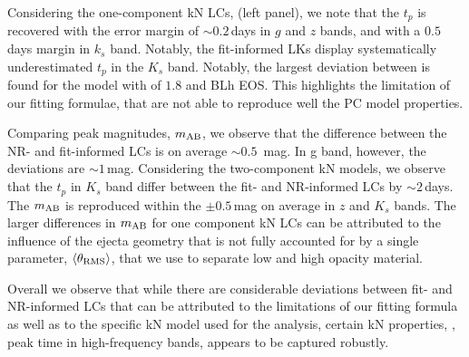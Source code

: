 Considering the one-component \ac{kN} \acp{LC}, (left panel), we note that the $t_p$ is 
recovered with the error margin of ${\sim}0.2\,$days in $g$ and $z$ bands, and with a 
$0.5\,$days margin in $k_s$ band. Notably, the fit-informed \acp{LK} display 
systematically underestimated $t_p$ in the $K_s$ band. 
%
Notably, the largest deviation between is found for the 
model with \mr{} of $1.8$ and BLh \ac{EOS}. This highlights the limitation of our 
fitting formulae, that are not able to reproduce well the \ac{PC} model properties.

Comparing peak magnitudes, $m_{\rm AB}$, we observe that the difference 
between the \ac{NR}- and fit-informed \acp{LC} is on average ${\sim}0.5$~mag. 
In g band, however, the deviations are ${\sim}1\,$mag.
Considering the two-component \ac{kN} models, we observe that the 
$t_p$ in $K_s$ band differ between the fit- and \ac{NR}-informed \acp{LC} by 
${\sim}2\,$days. The $m_{\rm AB}$ is reproduced within the ${\pm}0.5\,$mag 
on average in $z$ and $K_s$ bands.
%
The larger differences in $m_{\rm AB}$ for one component \ac{kN} \acp{LC} 
can be attributed to the influence of the ejecta geometry that is not 
fully accounted for by a single parameter, $\langle\theta_{\rm RMS}\rangle$, that we use to 
separate low and high opacity material. 

Overall we observe that while there are considerable deviations between fit- and 
\ac{NR}-informed \acp{LC} that can be attributed to the limitations of 
our fitting formula as well as to the specific \ac{kN} model used for the 
analysis, certain \ac{kN} properties, \eg, peak time in high-frequency bands, 
appears to be captured robustly. 


